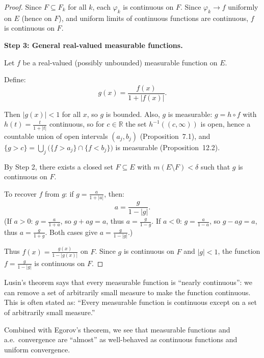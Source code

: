 \documentclass[11pt]{report}
\begin{document}
\begin{proof}
Since $F \subseteq F_k$ for all $k$, each $\varphi_k$ is continuous on $F$. Since $\varphi_k \to f$ uniformly on $E$ (hence on $F$), and uniform limits of continuous functions are continuous, $f$ is continuous on $F$.

\textbf{Step 3: General real-valued measurable functions.}

Let $f$ be a real-valued (possibly unbounded) measurable function on $E$.

Define:
\[
g(x) = \frac{f(x)}{1 + |f(x)|}.
\]

Then $|g(x)| < 1$ for all $x$, so $g$ is bounded. Also, $g$ is measurable: $g = h \circ f$ with $h(t) = \frac{t}{1+|t|}$ continuous, so for $c \in \mathbb{R}$ the set $h^{-1}((c, \infty))$ is open, hence a countable union of open intervals $(a_j, b_j)$ (Proposition~7.1), and $\{g > c\} = \bigcup_j \bigl(\{f > a_j\} \cap \{f < b_j\}\bigr)$ is measurable (Proposition~12.2).

By Step 2, there exists a closed set $F \subseteq E$ with $m(E \setminus F) < \delta$ such that $g$ is continuous on $F$.

To recover $f$ from $g$: if $g = \frac{a}{1+|a|}$, then:
\[
a = \frac{g}{1 - |g|}.
\]
(If $a > 0$: $g = \frac{a}{1+a}$, so $g + ag = a$, thus $a = \frac{g}{1-g}$. If $a < 0$: $g = \frac{a}{1-a}$, so $g - ag = a$, thus $a = \frac{g}{1+g}$. Both cases give $a = \frac{g}{1-|g|}$.)

Thus $f(x) = \frac{g(x)}{1 - |g(x)|}$ on $F$. Since $g$ is continuous on $F$ and $|g| < 1$, the function $f = \frac{g}{1-|g|}$ is continuous on $F$.
\end{proof}

\begin{rembox}
Lusin's theorem says that every measurable function is ``nearly continuous'': we can remove a set of arbitrarily small measure to make the function continuous. This is often stated as: ``Every measurable function is continuous except on a set of arbitrarily small measure.''

Combined with Egorov's theorem, we see that measurable functions and a.e.\ convergence are ``almost'' as well-behaved as continuous functions and uniform convergence.
\end{rembox}
\end{document}

